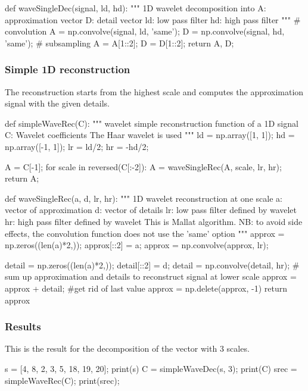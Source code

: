 \begin{python}
def waveSingleDec(signal, ld, hd):
    """
    1D wavelet decomposition into
    A: approximation vector
    D: detail vector
    ld: low pass filter
    hd: high pass filter
    """
    # convolution
    A = np.convolve(signal, ld, 'same');
    D = np.convolve(signal, hd, 'same');
    # subsampling
    A = A[1::2];
    D = D[1::2];
    return A, D;
\end{python}

\subsubsection{Simple 1D reconstruction}
The reconstruction starts from the highest scale and computes the approximation signal with the given details.
\begin{python}
def simpleWaveRec(C):
    """
    wavelet simple reconstruction function of a 1D signal
    C: Wavelet coefficients 
    The Haar wavelet is used
    """
    ld = np.array([1, 1]);
    hd = np.array([-1, 1]);
    lr = ld/2;
    hr = -hd/2;
    
    A = C[-1];
    for scale in reversed(C[:-2]):
        A = waveSingleRec(A, scale, lr, hr);
    return A;
\end{python}

\begin{python}
def waveSingleRec(a, d, lr, hr):
    """
    1D wavelet reconstruction at one scale
    a: vector of approximation
    d: vector of details
    lr: low pass filter defined by wavelet
    hr: high pass filter defined by wavelet
    This is Mallat algorithm.
    NB: to avoid side effects, the convolution function does not use the
    'same' option
    """
    approx = np.zeros((len(a)*2,));
    approx[::2] = a;
    approx = np.convolve(approx, lr);
    
    detail = np.zeros((len(a)*2,));
    detail[::2] = d;
    detail = np.convolve(detail, hr);
    # sum up approximation and details to reconstruct signal at lower scale
    approx = approx + detail;
    #get rid of last value
    approx = np.delete(approx, -1)
    return approx
\end{python}

\subsubsection{Results}
This is the result for the decomposition of the vector with 3 scales.
\begin{python}
s = [4, 8, 2, 3, 5, 18, 19, 20];
print(s)
C = simpleWaveDec(s, 3);
print(C)
srec = simpleWaveRec(C);
print(srec);
\end{python}


